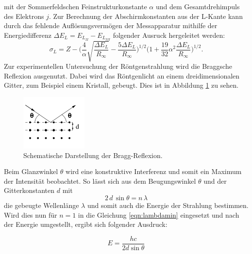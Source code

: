 mit der Sommerfeldschen Feinstrukturkonstante $\alpha$ und dem Gesamtdrehimpuls des Elektrons $j$.
Zur Berechnung der Abschirmkonstanten aus der L-Kante kann durch das fehlende Auflösungsvermögen der Messapparatur mithilfe der Energiedifferenz $\Delta E_L = E_{L_{II}}- E_{L_{III}}$ folgender
Ausruck hergeleitet werden:
\begin{equation}
{\sigma}_L = Z - \Biggl(\frac{4}{\alpha} \sqrt{\frac{\Delta E_L}{R_{\infty}}} - \frac{5 \Delta E_L}{R_{\infty}} \Biggr)^{1/2} \Biggl(1+ \frac{19}{32} {\alpha}^2 \frac{\Delta E_L}{R_{\infty}} \Biggr)^{1/2} .
\label{eqn:sigmaL}
\end{equation}
Zur experimentellen Untersuchung der Röntgenstrahlung wird die Braggsche Reflexion ausgenutzt. Dabei wird das Röntgenlicht an einem dreidimensionalen Gitter, zum Beispiel einem Kristall, gebeugt.
Dies ist in Abbildung \ref{fig:braggreflexion} zu sehen.
\begin{figure}
  \centering
  \includegraphics{images/bragg.png}
  \caption{Schematische Darstellung der Bragg-Reflexion.\cite{sample}}
  \label{fig:braggreflexion}
\end{figure}
Beim Glanzwinkel $\theta$ wird eine konstruktive Interferenz und somit ein Maximum der Intensität beobachtet. So lässt sich aus dem Beugungswinkel $\theta$ und der Gitterkonstanten $d$ mit
\begin{equation}
  2 \, d \, \sin{\theta} = n \, \lambda
  \label{eqn:bragg}
\end{equation}
die gebeugte Wellenlänge $\lambda$ und somit auch die Energie der Strahlung bestimmen.
Wird dies nun für $n = 1$ in die Gleichung \eqref{eqn:lambdamin} eingesetzt und nach der Energie umgestellt, ergibt sich folgender Ausdruck:

\begin{equation}
  E = \frac{h c}{2 d \sin{\theta}}
  \label{eqn:Energie}
\end{equation}
